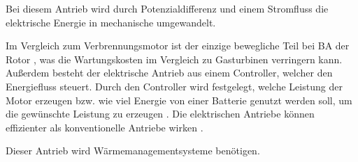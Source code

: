 
Bei diesem Antrieb wird durch Potenzialdifferenz und einem Stromfluss die elektrische Energie in mechanische umgewandelt.

Im Vergleich zum Verbrennungsmotor ist der einzige bewegliche Teil bei BA der Rotor \cite{donckers2024electric}, 
was die Wartungskosten im Vergleich zu Gasturbinen verringern kann. Außerdem besteht der elektrische Antrieb aus einem Controller, welcher den Energiefluss steuert. 
Durch den Controller wird festgelegt, welche Leistung der Motor erzeugen bzw. wie viel Energie von 
einer Batterie genutzt werden soll, um die gewünschte Leistung zu erzeugen \cite{donckers2024electric}. 
Die elektrischen Antriebe können effizienter als konventionelle Antriebe wirken \cite{hepperle2012electric}.

Dieser Antrieb wird Wärmemanagementsysteme benötigen. 

